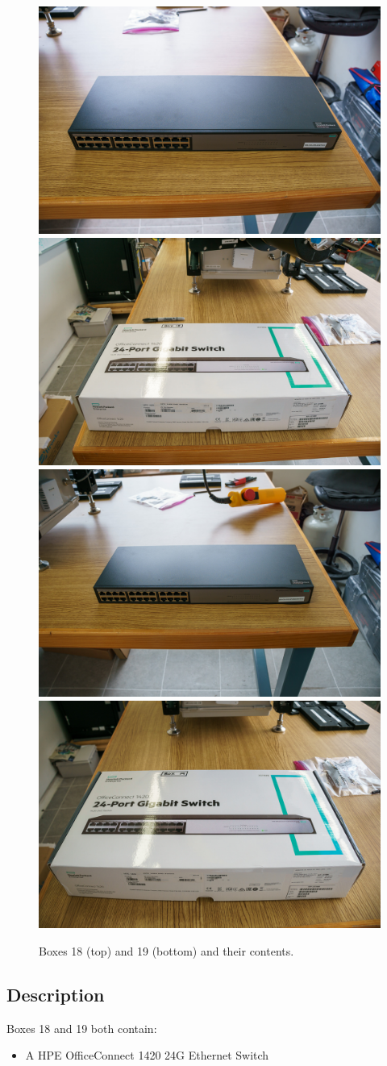 \documentclass{article}
\begin{document}
\begin{figure}[bp]
\begin{center}
\includegraphics[width=0.40\linewidth]{figures/20201207T132215.jpg}
\includegraphics[width=0.40\linewidth]{figures/20201207T133020.jpg}\\[\smallskipamount]
\includegraphics[width=0.40\linewidth]{figures/20201207T132112.jpg}
\includegraphics[width=0.40\linewidth]{figures/20201207T132404.jpg}
\end{center}
\caption{Boxes 18 (top) and 19 (bottom) and their contents.}
\label{figure:box-switches}
\end{figure}

\subsection{Description}

Boxes 18 and 19 both contain:

\begin{itemize}
    \item A HPE OfficeConnect 1420 24G Ethernet Switch
\end{itemize}
\end{document}
